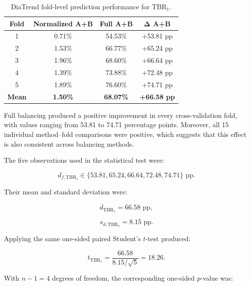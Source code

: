 \begin{table}[htbp]
\centering
\caption{DiaTrend fold-level prediction performance for TBR$_1$.}
\label{tab:diatrend_fold_tbr1_effect}
\begin{tabular}{cccc}
\toprule
\textbf{Fold}
& \textbf{Normalized A+B}
& \textbf{Full A+B}
& $\boldsymbol{\Delta}$ \textbf{A+B} \\
\midrule
1 & 0.71\% & 54.53\% & +53.81 pp \\
2 & 1.53\% & 66.77\% & +65.24 pp \\
3 & 1.96\% & 68.60\% & +66.64 pp \\
4 & 1.39\% & 73.88\% & +72.48 pp \\
5 & 1.89\% & 76.60\% & +74.71 pp \\
\midrule
\textbf{Mean}
& \textbf{1.50\%}
& \textbf{68.07\%}
& \textbf{+66.58 pp} \\
\bottomrule
\end{tabular}
\end{table}

Full balancing produced a positive improvement in every cross-validation fold, with values ranging from 53.81 to 74.71 percentage points. Moreover, all 15 individual method--fold comparisons were positive, which suggests that this effect is also consistent across balancing methods.

The five observations used in the statistical test were:

\begin{equation}
d_{f,\mathrm{TBR_1}}
\in
\{
53.81,
65.24,
66.64,
72.48,
74.71
\}
\text{ pp}.
\end{equation}

Their mean and standard deviation were:

\begin{equation}
\overline{d}_{\mathrm{TBR_1}}
=
66.58
\text{ pp},
\end{equation}

\begin{equation}
s_{d,\mathrm{TBR_1}}
=
8.15
\text{ pp}.
\end{equation}

Applying the same one-sided paired Student's $t$-test produced:

\begin{equation}
t_{\mathrm{TBR_1}}
=
\frac{66.58}{8.15/\sqrt{5}}
=
18.26.
\end{equation}

With $n-1=4$ degrees of freedom, the corresponding one-sided $p$-value was:

